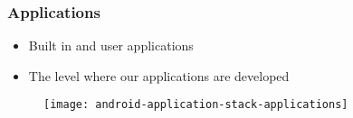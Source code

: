 %
%


\begin{frame}
  \frametitle{Applications}
  
  \begin{itemize}
  \item<1-> Built in and user applications
  \item<2-> The level where our applications are developed
  \end{itemize}

  \begin{figure}
    \centering
    \texttt{[image: android-application-stack-applications]}
  \end{figure}

\end{frame}


